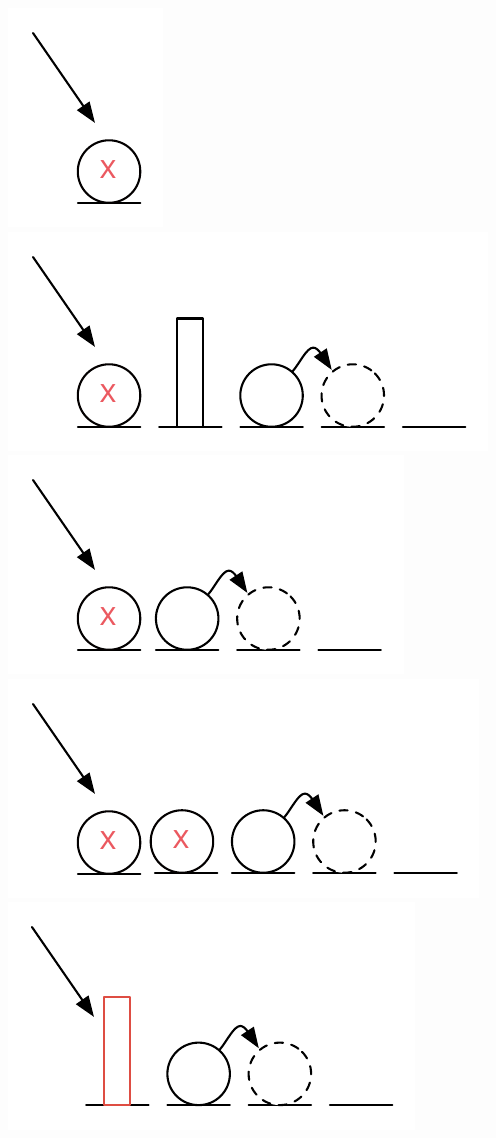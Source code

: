 \documentclass[]{article}
\makeatletter
\def\maxwidth{\ifdim\Gin@nat@width>\linewidth\linewidth
\else\Gin@nat@width\fi}
\let\Oldincludegraphics\includegraphics
\renewcommand{\includegraphics}[1]{\Oldincludegraphics[width=\maxwidth]{#1}}
\makeatother
\begin{document}
\includegraphics{figs/test1.pdf} \includegraphics{figs/test2.pdf}
\includegraphics{figs/test3.pdf} \includegraphics{figs/test4.pdf}
\includegraphics{figs/test5.pdf}
\end{document}
